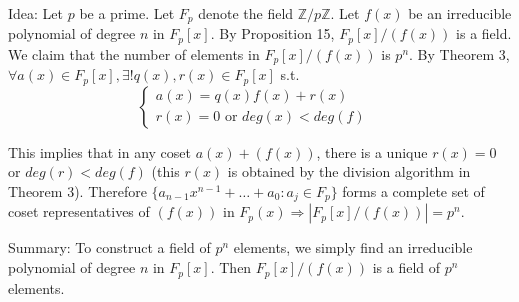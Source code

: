 \documentclass{article}
\theoremstyle{definition}
\begin{document}
  \par Idea: Let $p$ be a prime. Let $F_p$ denote the field $\mathbb{Z}/p\mathbb{Z}$. Let $f(x)$ be an irreducible polynomial of degree $n$ in $F_p[x]$. By Proposition 15, $F_p[x]/(f(x))$ is a field. We claim that the number of elements in $F_p[x]/(f(x))$ is $p^n$. By Theorem 3, $\forall a(x) \in F_p[x], \exists ! q(x), r(x) \in F_p[x]$ s.t.
  \[
	\begin{cases}
	  a(x) = q(x) f(x) + r(x) & \\
	  r(x) = 0 \text{ or } deg(x) < deg(f) & 
	\end{cases}
  \]
  \par This implies that in any coset $a(x) + (f(x))$, there is a unique $r(x) = 0$ or $deg(r) < deg(f)$ (this $r(x)$ is obtained by the division algorithm in Theorem 3). Therefore $\{a_{n - 1} x^{n - 1} + \hdots + a_0: a_j \in F_p\}$ forms a complete set of coset representatives of $(f(x))$ in $F_p(x) \Rightarrow |F_p[x]/(f(x))| = p^n$.
  
  \par Summary: To construct a field of $p^n$ elements, we simply find an irreducible polynomial of degree $n$ in $F_p[x]$. Then $F_p[x]/(f(x))$ is a field of $p^n$ elements.
  
  
\end{document}
